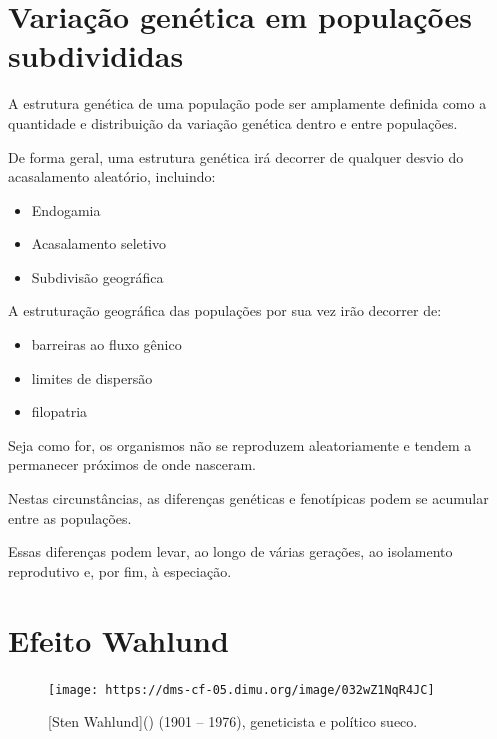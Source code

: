 \documentclass[
]{book}
\begin{document}
\hypertarget{variauxe7uxe3o-genuxe9tica-em-populauxe7uxf5es-subdivididas}{%
\section{Variação genética em populações subdivididas}\label{variauxe7uxe3o-genuxe9tica-em-populauxe7uxf5es-subdivididas}}

A estrutura genética de uma população pode ser amplamente definida como a quantidade e distribuição da variação genética dentro e entre populações.

De forma geral, uma estrutura genética irá decorrer de qualquer desvio do acasalamento aleatório, incluindo:

\begin{itemize}
\item
  Endogamia
\item
  Acasalamento seletivo
\item
  Subdivisão geográfica
\end{itemize}

A estruturação geográfica das populações por sua vez irão decorrer de:

\begin{itemize}
\item
  barreiras ao fluxo gênico
\item
  limites de dispersão
\item
  filopatria
\end{itemize}

Seja como for, os organismos não se reproduzem aleatoriamente e tendem a permanecer próximos de onde nasceram.

Nestas circunstâncias, as diferenças genéticas e fenotípicas podem se acumular entre as populações.

Essas diferenças podem levar, ao longo de várias gerações, ao isolamento reprodutivo e, por fim, à especiação.

\hypertarget{efeito-wahlund}{%
\section{Efeito Wahlund}\label{efeito-wahlund}}

\begin{figure}

\hfill{}\texttt{[image: https://dms-cf-05.dimu.org/image/032wZ1NqR4JC]} 

\caption{[Sten Wahlund]() (1901 – 1976), geneticista e político sueco.}\label{fig:wahlund}
\end{figure}
\end{document}
